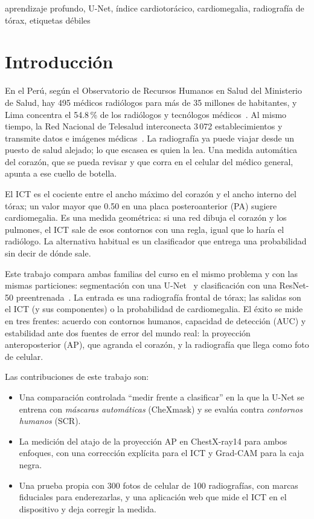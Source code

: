 \documentclass[conference]{IEEEtran}
\begin{document}
\begin{IEEEkeywords}
aprendizaje profundo, U-Net, índice cardiotorácico, cardiomegalia, radiografía de tórax, etiquetas débiles
\end{IEEEkeywords}

\section{Introducción}

En el Perú, según el Observatorio de Recursos Humanos en Salud del Ministerio de Salud, hay 495 médicos radiólogos
para más de 35 millones de habitantes, y Lima concentra el 54.8\,\% de los radiólogos y tecnólogos
médicos~\cite{panamericana2025radiologos}. Al mismo tiempo, la Red Nacional de Telesalud interconecta 3\,072
establecimientos y transmite datos e imágenes médicas~\cite{panamericana2026telesalud}. La radiografía ya puede
viajar desde un puesto de salud alejado; lo que escasea es quien la lea. Una medida automática del corazón, que se
pueda revisar y que corra en el celular del médico general, apunta a ese cuello de botella.

El ICT es el cociente entre el ancho máximo del corazón y el ancho interno del tórax; un valor mayor que 0.50 en una
placa posteroanterior (PA) sugiere cardiomegalia. Es una medida geométrica: si una red dibuja el corazón y los
pulmones, el ICT sale de esos contornos con una regla, igual que lo haría el radiólogo. La alternativa habitual es un
clasificador que entrega una probabilidad sin decir de dónde sale.

Este trabajo compara ambas familias del curso en el mismo problema y con las mismas particiones: segmentación con una
U-Net~\cite{ronneberger2015unet} y clasificación con una ResNet-50 preentrenada~\cite{he2016resnet}. La entrada es
una radiografía frontal de tórax; las salidas son el ICT (y sus componentes) o la probabilidad de cardiomegalia. El
éxito se mide en tres frentes: acuerdo con contornos humanos, capacidad de detección (AUC) y estabilidad ante dos
fuentes de error del mundo real: la proyección anteroposterior (AP), que agranda el corazón, y la radiografía que llega
como foto de celular.

Las contribuciones de este trabajo son:
\begin{itemize}
\item Una comparación controlada ``medir frente a clasificar'' en la que la U-Net se entrena con \emph{máscaras
  automáticas} (CheXmask) y se evalúa contra \emph{contornos humanos} (SCR).
\item La medición del atajo de la proyección AP en ChestX-ray14 para ambos enfoques, con una corrección explícita para
  el ICT y Grad-CAM para la caja negra.
\item Una prueba propia con 300 fotos de celular de 100 radiografías, con marcas fiduciales para enderezarlas, y una
  aplicación web que mide el ICT en el dispositivo y deja corregir la medida.
\end{itemize}
\end{document}
